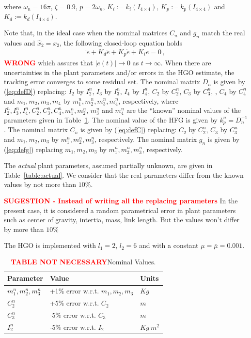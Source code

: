 \documentclass[letterpaper, 10 pt, journal, twocolumn]{IEEEtran}  %
\theoremstyle{plain}
\theoremstyle{definition}
\theoremstyle{remark}
\begin{document}
where $\omega_n = 16\pi$, $\zeta = 0.9$, $p = 2\omega_n$, $K_i := k_i(I_{4 \times 4})$, $K_p := k_p(I_{4 \times 4})$ and $K_d := k_d(I_{4 \times 4})$.
%


Note that, in the ideal case when the nominal matrices $C_n$ and $g_n$ match the real values and $\hat{x}_2=x_2$, the following closed-loop equation holds
%
\begin{align}
\dddot{e} + K_d \ddot{e} + K_p \dot{e} + K_i e =0\,,
\label{eq:closed}
\end{align}
%
\textcolor{red}{\textbf{WRONG}} which assures that $|e(t)| \rightarrow 0$ as $t \rightarrow \infty$. When  there are uncertainties in the plant parameters and/or errors in the HGO estimate, the tracking error converges to some residual set.  The nominal matrix $D_n$ is given by (\ref{eq:defD}) replacing: $I_2$ by $I_2^n$, $I_3$ by $I_3^n$, $I_4$ by $I_4^n$, $C_2$ by $C_2^n$, $C_3$ by $C_3^n$, , $C_4$ by $C_4^n$ and $m_1,m_2,m_3,m_4$ by $m_1^n, m_2^n, m_3^n, m_4^n$, respectively,  where  $I_2^n, I_3^n, I_4^n, C_2^n, C_3^n, C_4^n, m_1^n, m_2^n$, $m_3^n$ and $m_4^n$ are  the ``known'' nominal values of the parameters given in Table~\ref{table:nominal}. The nominal value of the HFG is given by $k_p^n=D_n^{-1}$. The nominal matrix $C_n$ is given by (\ref{eq:defC}) replacing: $C_2$ by $C_2^n$, $C_3$ by $C_3^n$ and $m_1,m_2,m_3$ by $m_1^n,m_2^n,m_3^n$, respectively. The nominal matrix $g_n$ is given by (\ref{eq:defg}) replacing  $m_1,m_2,m_3$ by $m_1^n, m_2^n, m_3^n$, respectively.  

The {\em actual} plant parameters, assumed partially unknown, are given in Table~\ref{table:actual}. We consider that  the real parameters differ from the known values by not more than $10\%$. 

\textcolor{red}{\textbf{SUGESTION - Instead of writing all the replacing parameters}} In the present case, it is considered a random parametrical error in plant parameters such as center of gravity, intertia, mass, link length. But the values won't differ by more than $10\%$


The HGO is implemented with $l_1=2$, $l_2=6$ and with a constant $\mu=\bar{\mu}=0.001$.
%

\begin{table}[h!]
\centering
\caption{\textcolor{red}{\textbf{TABLE NOT NECESSARY}}Nominal Values.} 
\begin{tabular}{ |p{2cm} p{3.5cm} p{1cm}|  }
 \hline
 Parameter & Value & Units\\
 \hline
	$m_1^n,m_2^n, m_3^n$ & +1\% error w.r.t. $m_1,m_2, m_3$ & $Kg$\\
	$C_2^n$ & +5\% error w.r.t. $C_2$ & $m$\\
	$C_3^n$ & -5\% error  w.r.t. $C_3$  & $m$\\
	$I_2^n$ & -5\% error  w.r.t. $I_2$  & $Kg \ m^2$ \\
\hline
\end{tabular}
\label{table:nominal}
\end{table}
%
\end{document}
